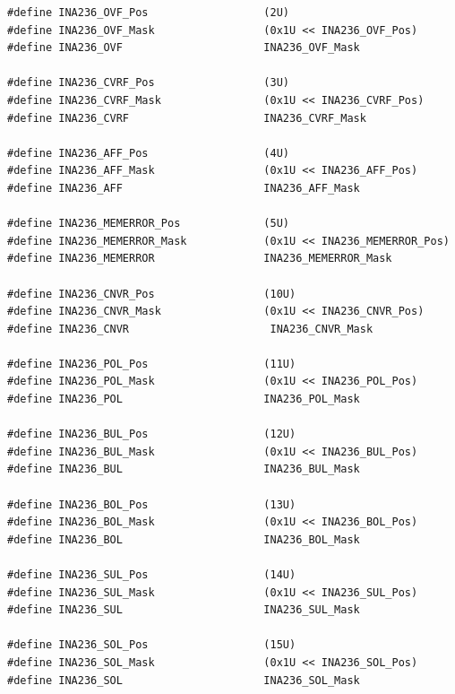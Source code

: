 \documentclass[
10pt, %
a4paper, %
oneside, %
headinclude,footinclude, %
BCOR5mm, %
]{scrartcl}
\begin{document}
\begin{lstlisting}[style=CMakeStyle]
#define INA236_OVF_Pos                  (2U)
#define INA236_OVF_Mask                 (0x1U << INA236_OVF_Pos)
#define INA236_OVF                      INA236_OVF_Mask

#define INA236_CVRF_Pos                 (3U)
#define INA236_CVRF_Mask                (0x1U << INA236_CVRF_Pos)
#define INA236_CVRF                     INA236_CVRF_Mask

#define INA236_AFF_Pos                  (4U)
#define INA236_AFF_Mask                 (0x1U << INA236_AFF_Pos)
#define INA236_AFF                      INA236_AFF_Mask

#define INA236_MEMERROR_Pos             (5U)
#define INA236_MEMERROR_Mask            (0x1U << INA236_MEMERROR_Pos)
#define INA236_MEMERROR                 INA236_MEMERROR_Mask

#define INA236_CNVR_Pos                 (10U)
#define INA236_CNVR_Mask                (0x1U << INA236_CNVR_Pos)
#define INA236_CNVR                      INA236_CNVR_Mask

#define INA236_POL_Pos                  (11U)
#define INA236_POL_Mask                 (0x1U << INA236_POL_Pos)
#define INA236_POL                      INA236_POL_Mask

#define INA236_BUL_Pos                  (12U)
#define INA236_BUL_Mask                 (0x1U << INA236_BUL_Pos)
#define INA236_BUL                      INA236_BUL_Mask

#define INA236_BOL_Pos                  (13U)
#define INA236_BOL_Mask                 (0x1U << INA236_BOL_Pos)
#define INA236_BOL                      INA236_BOL_Mask

#define INA236_SUL_Pos                  (14U)
#define INA236_SUL_Mask                 (0x1U << INA236_SUL_Pos)
#define INA236_SUL                      INA236_SUL_Mask

#define INA236_SOL_Pos                  (15U)
#define INA236_SOL_Mask                 (0x1U << INA236_SOL_Pos)
#define INA236_SOL                      INA236_SOL_Mask
\end{lstlisting}
\end{document}
